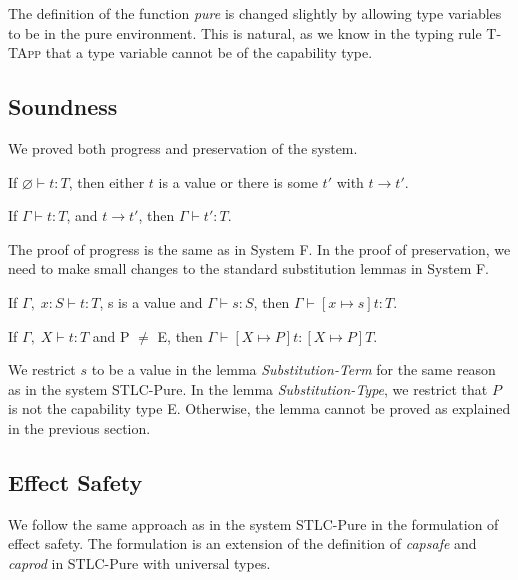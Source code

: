 The definition of the function \emph{pure} is changed slightly by
allowing type variables to be in the pure environment. This is
natural, as we know in the typing rule \textsc{T-TApp} that a type
variable cannot be of the capability type.

\subsection{Soundness}

We proved both progress and preservation of the system.

\begin{theorem}[Progress]
If $\varnothing \vdash t : T$, then either $t$ is a value or there is some
$t'$ with $t \longrightarrow t'$.
\end{theorem}

\begin{theorem}[Preservation]
If $\Gamma \vdash t : T$, and $t \longrightarrow t'$, then $\Gamma
\vdash t' : T$.
\end{theorem}

The proof of progress is the same as in System F. In the proof of
preservation, we need to make small changes to the standard
substitution lemmas in System F.

\begin{lemma}
  If $\Gamma,\; x:S \vdash t : T$, s is a value and
  $\Gamma \vdash s : S$, then $\Gamma \vdash [x \mapsto s]t : T$.
\end{lemma}

\begin{lemma}
  If $\Gamma,\; X \vdash t : T$ and P $\neq$ E,
  then $\Gamma \vdash [X \mapsto P]t : [X \mapsto P]T$.
\end{lemma}

We restrict $s$ to be a value in the lemma \emph{Substitution-Term}
for the same reason as in the system STLC-Pure. In the lemma
\emph{Substitution-Type}, we restrict that $P$ is not the capability
type E. Otherwise, the lemma cannot be proved as explained in the
previous section.

\subsection{Effect Safety}

We follow the same approach as in the system STLC-Pure in the
formulation of effect safety. The formulation is an extension of the
definition of \emph{capsafe} and \emph{caprod} in STLC-Pure with
universal types.

